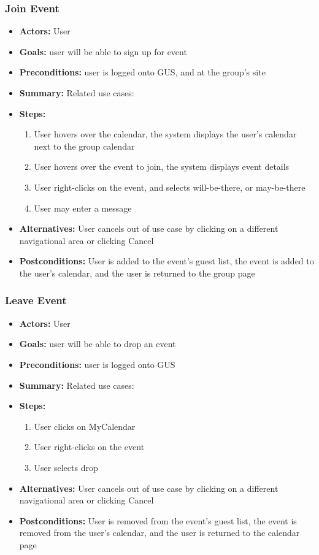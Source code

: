 	      \subsubsection{Join Event}
			\begin{itemize}
				\item{\textbf{Actors:} User}
				\item{\textbf{Goals:} user will be able to sign up for event}
				\item{\textbf{Preconditions:} user is logged onto GUS, and at the group's site}
				\item{\textbf{Summary:} Related use cases: }
				\item{\textbf{Steps:}
				\begin{enumerate}
					\item{User hovers over the calendar, the system displays the user's calendar next to the group calendar}
					\item{User hovers over the event to join, the system displays event details}
					\item{User right-clicks on the event, and selects will-be-there, or may-be-there}
					\item{User may enter a message}
				\end{enumerate}
				}
				\item{\textbf{Alternatives:} User cancels out of use case by clicking on a different navigational area or clicking Cancel}
				\item{\textbf{Postconditions:} User is added to the event's guest list, the event is added to the user's calendar, and the user is returned to the group page}
			\end{itemize}
         \subsubsection{Leave Event}
			\begin{itemize}
				\item{\textbf{Actors:} User}
				\item{\textbf{Goals:} user will be able to drop an event}
				\item{\textbf{Preconditions:} user is logged onto GUS}
				\item{\textbf{Summary:} Related use cases: }
				\item{\textbf{Steps:}
				\begin{enumerate}
					\item{User clicks on MyCalendar}
					\item{User right-clicks on the event}
					\item{User selects drop}
				\end{enumerate}
				}
				\item{\textbf{Alternatives:} User cancels out of use case by clicking on a different navigational area or clicking Cancel}
				\item{\textbf{Postconditions:} User is removed from the event's guest list, the event is removed from the user's calendar, and the user is returned to the calendar page}
			\end{itemize}
